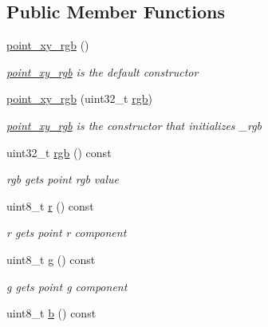 \subsection*{Public Member Functions}
\begin{DoxyCompactItemize}
\item 
\hyperlink{classcloud__object__segmentation_1_1point__xy__rgb_ae897273bdd0db1f77493e328a7771f4b}{point\+\_\+xy\+\_\+rgb} ()
\begin{DoxyCompactList}\small\item\em \hyperlink{classcloud__object__segmentation_1_1point__xy__rgb}{point\+\_\+xy\+\_\+rgb} is the default constructor \end{DoxyCompactList}\item 
\hyperlink{classcloud__object__segmentation_1_1point__xy__rgb_af5fa8bff57f7d50392530379f367994c}{point\+\_\+xy\+\_\+rgb} (uint32\+\_\+t \hyperlink{classcloud__object__segmentation_1_1point__xy__rgb_a2839d12266dfc06ad01c4dbf7610fb93}{rgb})
\begin{DoxyCompactList}\small\item\em \hyperlink{classcloud__object__segmentation_1_1point__xy__rgb}{point\+\_\+xy\+\_\+rgb} is the constructor that initializes \+\_\+rgb \end{DoxyCompactList}\item 
uint32\+\_\+t \hyperlink{classcloud__object__segmentation_1_1point__xy__rgb_a2839d12266dfc06ad01c4dbf7610fb93}{rgb} () const 
\begin{DoxyCompactList}\small\item\em rgb gets point rgb value \end{DoxyCompactList}\item 
uint8\+\_\+t \hyperlink{classcloud__object__segmentation_1_1point__xy__rgb_a34a75f114e94a8c17dec4b275ba011ce}{r} () const 
\begin{DoxyCompactList}\small\item\em r gets point r component \end{DoxyCompactList}\item 
uint8\+\_\+t \hyperlink{classcloud__object__segmentation_1_1point__xy__rgb_af7727071e29ea0901ebd1bd23feeb537}{g} () const 
\begin{DoxyCompactList}\small\item\em g gets point g component \end{DoxyCompactList}\item 
uint8\+\_\+t \hyperlink{classcloud__object__segmentation_1_1point__xy__rgb_a368ce4b526b7d1a26231074a01156f67}{b} () const 

\end{DoxyCompactItemize}
